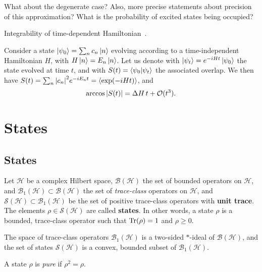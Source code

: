 \documentclass[12pt]{report}
\newcommand{\calB}{{\mathcal{B}}}
\newcommand{\calH}{{\mathcal{H}}}
\newcommand{\calS}{{\mathcal{S}}}
\begin{document}
\begin{question}
	What about the degenerate case? Also, more precise statements about precision of this approximation? What is the probability of excited states being occupied?
\end{question}

Integrability of time-dependent Hamiltonian~\autocite{sinitsyn2018integrable}.

\begin{prop}
	Consider a state $\ket{\psi_0}=\sum_n c_n \ket n$ evolving according to a time-independent Hamiltonian $H$, with $H\ket n=E_n \ket n$. Let us denote with $\ket{\psi_t}=e^{-iHt}\ket{\psi_0}$ the state evolved at time $t$, and with $S(t)=\braket{\psi_0}{\psi_t}$ the associated overlap.
	We then have $S(t)=\sum_n \abs{c_n}^2 e^{-iE_n t}=\expval{\exp(-iHt)}$, and
	\begin{equation}
		\arccos\abs{S(t)} = \Delta H\, t + \mathcal O(t^3).
	\end{equation}
\end{prop}

\chapter{States}

\section{States}
\begin{defn}[State]
	Let $\calH$ be a complex Hilbert space, $\calB(\calH)$ the set of bounded operators on $\calH$,
	and $\calB_1(\calH)\subset\calB(\calH)$ the set of \emph{trace-class} operators on $\calH$,
	and $\calS(\calH)\subset\calB_1(\calH)$ be the set of positive trace-class operators with \textbf{unit trace}.
	The elements $\rho\in\calS(\calH)$ are called \textbf{states}.
	In other words, a state $\rho$ is a bounded, trace-class operator such that
	$\Tr(\rho)=1$ and $\rho\ge0$.
\end{defn}

\begin{prop}
	The space of trace-class operators $\calB_1(\calH)$ is a two-sided $*$-ideal of $\calB(\calH)$, and the set of states $\calS(\calH)$ is a convex, bounded subset of $\calB_1(\calH)$.
\end{prop}

\begin{defn}
	A state $\rho$ is \emph{pure} if $\rho^2=\rho$.
\end{defn}
\end{document}

